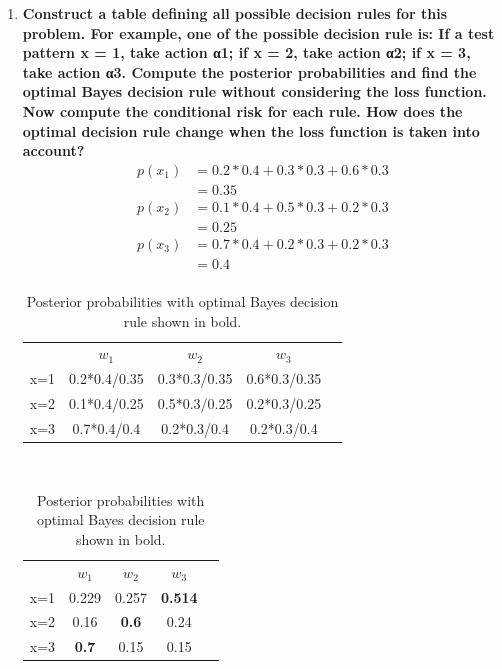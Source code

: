 \documentclass[12pt]{article}
\begin{document}
\begin{enumerate}
\begin{enumerate}
\begin{equation}
\begin{split}
      & = 0.3 \cdot 0.7 \cdot e^{-2.512} \\
      & \boxed{= 0.017}
    \end{split}
    \end{equation}
  \end{enumerate}
  Bhattacharya bound is tight with respect to the empirical error rates.
\item \textbf{Construct a table defining all possible decision rules for this problem. For example, one of the possible decision rule is: If a test pattern x = 1, take action α1; if x = 2, take action α2; if x = 3,
take action α3. Compute the posterior probabilities and ﬁnd the optimal Bayes decision rule without considering the loss function. Now compute the conditional risk for each rule. How does the optimal decision rule change when the loss function is taken into account?}
  \begin{equation}
  \begin{split}
    p(x_1)& = 0.2*0.4 + 0.3*0.3 + 0.6*0.3 \\
    & = 0.35 \\
    p(x_2)& = 0.1*0.4 + 0.5*0.3 + 0.2*0.3 \\
    & = 0.25 \\
    p(x_3)& = 0.7*0.4 + 0.2*0.3 + 0.2*0.3 \\
    & = 0.4 \\
  \end{split}
  \end{equation}
  \begin{table}[H]
  \centering
  \begin{tabular}{ccccc}
    & $w_1$ & $w_2$ & $w_3$ \\
    x=1 & 0.2*0.4/0.35 & 0.3*0.3/0.35 & 0.6*0.3/0.35 \\
    x=2 & 0.1*0.4/0.25 & 0.5*0.3/0.25 & 0.2*0.3/0.25 & \\
    x=3 & 0.7*0.4/0.4 & 0.2*0.3/0.4 & 0.2*0.3/0.4 &
  \end{tabular}
  \\
  \begin{tabular}{ccccc}
    & $w_1$ & $w_2$ & $w_3$ \\
    x=1 & 0.229 & 0.257 & \textbf{0.514} \\
    x=2 & 0.16 & \textbf{0.6} & 0.24 & \\
    x=3 & \textbf{0.7} & 0.15 & 0.15 &
  \end{tabular}
  \caption{Posterior probabilities with optimal Bayes decision rule shown in bold.}
  \end{table}

\end{enumerate}
\end{document}
